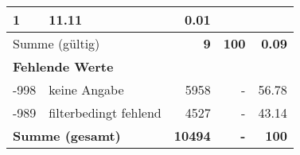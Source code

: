 \begin{longtable}{lXrrr}
       \num{1} &
       \num[round-mode=places,round-precision=2]{11.11} &
         \num[round-mode=places,round-precision=2]{0.01} \\
     \midrule
     \multicolumn{2}{l}{Summe (gültig)} &
       \textbf{\num{9}} &
     \textbf{\num{100}} &
       \textbf{\num[round-mode=places,round-precision=2]{0.09}} \\
     \multicolumn{5}{l}{\textbf{Fehlende Werte}}\\
       -998 &
       keine Angabe &
         \num{5958} &
        - &
         \num[round-mode=places,round-precision=2]{56.78} \\
       -989 &
       filterbedingt fehlend &
         \num{4527} &
        - &
         \num[round-mode=places,round-precision=2]{43.14} \\
     \midrule
     \multicolumn{2}{l}{\textbf{Summe (gesamt)}} &
          \textbf{\num{10494}} &
        \textbf{-} &
        \textbf{\num{100}} \\
     \bottomrule
     \end{longtable}
     
